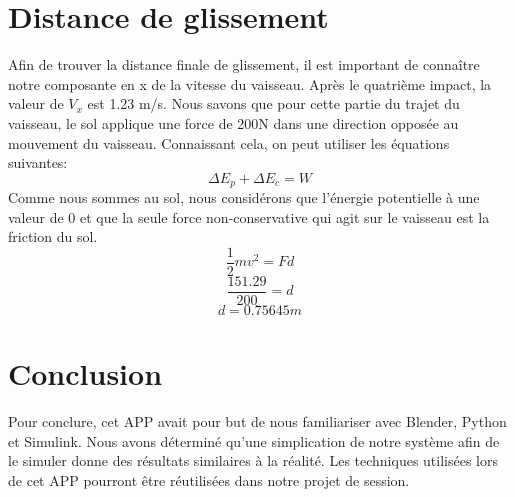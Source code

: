 \documentclass{article}
\begin{document}
\section{Distance de glissement}
Afin de trouver la distance finale de glissement, il est important de connaître notre composante en x de la vitesse du vaisseau. Après le quatrième impact, la valeur de $V_x$ est 1.23 m/s. Nous savons que pour cette partie du trajet du vaisseau, le sol applique une force de 200N dans une direction opposée au mouvement du vaisseau. Connaissant cela, on peut utiliser les équations suivantes:
\begin{equation}
	\Delta E_p + \Delta E_c = W
\end{equation}
Comme nous sommes au sol, nous considérons que l'énergie potentielle à une valeur de 0 et que la seule force non-conservative qui agit sur le vaisseau est la friction du sol.
\begin{equation}
	\frac{1}{2}mv^2 = Fd
\end{equation}
\begin{equation}
	\frac{151.29}{200} = d
\end{equation}
\begin{equation}
	d = 0.75645m
\end{equation}
 
\section{Conclusion}
Pour conclure, cet APP avait pour but de nous familiariser avec Blender, Python et Simulink. Nous avons déterminé qu'une simplication de notre système afin de le simuler donne des résultats similaires à la réalité. Les techniques utilisées lors de cet APP pourront être réutilisées dans notre projet de session.
\end{document}
